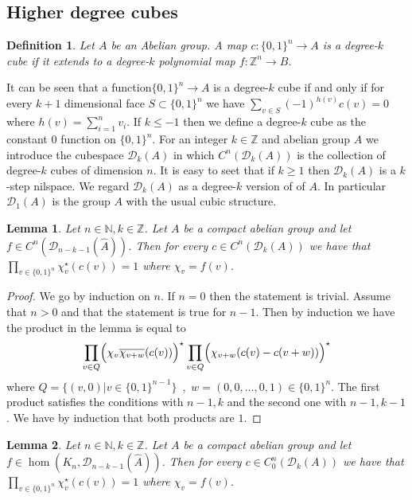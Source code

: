 \documentclass [11pt] {article}
\newtheorem{lemma}{Lemma}[section]
\newtheorem{definition}{Definition}[section]
\def\con{\star}
\begin{document}
\subsection{Higher degree cubes}

\begin{definition} Let $A$ be an Abelian group. A map $c:\{0,1\}^n\rightarrow A$ is a degree-$k$ cube if it extends to a  degree-$k$ polynomial map $f:\mathbb{Z}^n\rightarrow B$. 
\end{definition}

It can be seen that a function$\{0,1\}^n\rightarrow A$ is a degree-$k$ cube if and only if for every $k+1$ dimensional face $S\subset\{0,1\}^n$ we have $\sum_{v\in S}(-1)^{h(v)}c(v)=0$ where $h(v)=\sum_{i=1}^nv_i$.
If $k\leq-1$ then we define a degree-$k$ cube as the constant $0$ function on $\{0,1\}^n$.
For an integer $k\in\mathbb{Z}$ and abelian group $A$ we introduce the cubespace $\mathcal{D}_k(A)$ in which $C^n(\mathcal{D}_k(A))$ is the collection of degree-$k$ cubes of dimension $n$. It is easy to seet that if $k\geq 1$ then $\mathcal{D}_k(A)$ is a $k$-step nilspace. We regard $\mathcal{D}_k(A)$ as a degree-$k$ version of of $A$. In particular $\mathcal{D}_1(A)$ is the group $A$ with the usual cubic structure.

\begin{lemma}\label{dualker1} Let $n\in\mathbb{N},k\in\mathbb{Z}$. Let $A$ be a compact abelian group and let $f\in C^n(\mathcal{D}_{n-k-1}(\hat{A}))$. Then for every $c\in C^n(\mathcal{D}_k(A))$ we have that $\prod_{v\in\{0,1\}^n} \chi_v^\con(c(v))=1$ where $\chi_v=f(v)$.
\end{lemma}

\begin{proof} We go by induction on $n$. If $n=0$ then the statement is trivial.  
Assume that $n>0$ and that the statement is true for $n-1$. Then by induction we have the product in the lemma is equal to $$\prod_{v\in Q}\Bigl(\chi_v\overline{\chi_{v+w}}(c(v))\Bigr)^\con\prod_{v\in Q}\Bigl(\chi_{v+w}(c(v)-c(v+w))\Bigr)^\con$$
where $Q=\{(v,0)|v\in\{0,1\}^{n-1}\}$~,~$w=(0,0,\dots,0,1)\in\{0,1\}^n$.
The first product satisfies the conditions with $n-1,k$ and the second one with $n-1,k-1$. We have by induction that both products are $1$.
\end{proof}

\begin{lemma}\label{dualker2} Let $n\in\mathbb{N},k\in\mathbb{Z}$. Let $A$ be a compact abelian group and let $f\in\hom(K_n,\mathcal{D}_{n-k-1}(\hat{A}))$. Then for every $c\in C^n_0(\mathcal{D}_k(A))$ we have that $\prod_{v\in\{0,1\}^n}\chi_v^\con(c(v))=1$ where $\chi_v=f(v)$.
\end{lemma}
\end{document}
